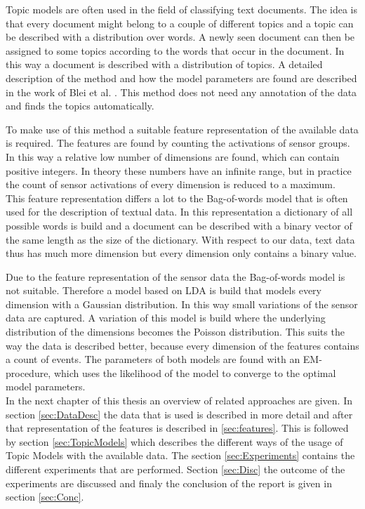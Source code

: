 Topic models are often used in the field of classifying text documents. The idea is that every document might belong to a couple of different topics and a topic can be described with a distribution over words. A newly seen document can then be assigned to some topics according to the words that occur in the document. In this way a document is described with a distribution of topics. A detailed description of the method and how the model parameters are found are described in the work of Blei et al. \cite{blei2003latent}. This method does not need any annotation of the data and finds the topics automatically.

To make use of this method a suitable feature representation of the available data is required. The features are found by counting the activations of sensor groups. In this way a relative low number of dimensions are found, which can contain positive integers. In theory these numbers have an infinite range, but in practice the count of sensor activations of every dimension is reduced to a maximum.\\
This feature representation differs a lot to the Bag-of-words model that is often used for the description of textual data. In this representation a dictionary of all possible words is build and a document can be described with a binary vector of the same length as the size of the dictionary. With respect to our data, text data thus has much more dimension but every dimension only contains a binary value.

Due to the feature representation of the sensor data the Bag-of-words model is not suitable. Therefore a model based on LDA is build that models every dimension with a Gaussian distribution. In this way small variations of the sensor data are captured. A variation of this model is build where the underlying distribution of the dimensions becomes the Poisson distribution. This suits the way the data is described better, because every dimension of the features contains a count of events. The parameters of both models are found with an EM-procedure, which uses the likelihood of the model to converge to the optimal model parameters.\\


In the next chapter of this thesis an overview of related approaches are given. In section \ref{sec:DataDesc} the data that is used is described in more detail and after that representation of the features is described in \ref{sec:features}. This is followed by section \ref{sec:TopicModels} which describes the different ways of the usage of Topic Models with the available data. The section \ref{sec:Experiments} contains the different experiments that are performed. Section \ref{sec:Disc} the outcome of the experiments are discussed and finaly the conclusion of the report is given in section \ref{sec:Conc}.